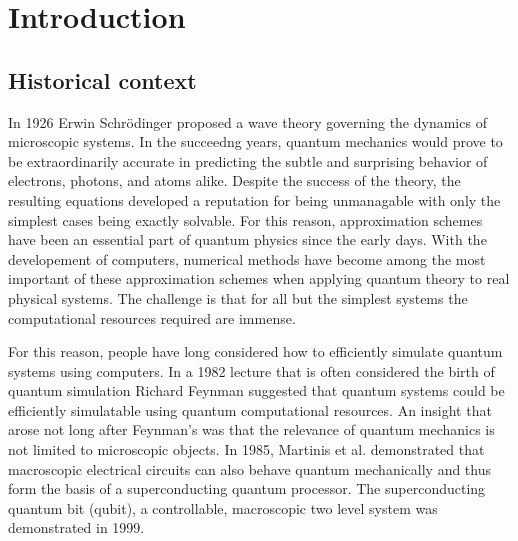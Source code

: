 \chapter{Introduction}\label{ch:introduction}
\section{Historical context}

In 1926 Erwin Schr\"odinger proposed a wave theory governing the dynamics of microscopic systems.\cite{Schrodinger1926}
In the succeedng years, quantum mechanics would prove to be extraordinarily accurate in predicting the subtle and surprising behavior of electrons, photons, and atoms alike.
Despite the success of the theory,
the resulting equations developed a reputation for being unmanagable with only the simplest cases being exactly solvable.
For this reason, approximation schemes have been an essential part of quantum physics since the early days.  %
With the developement of computers,
numerical methods have become among the most important of these approximation schemes when applying quantum theory to real physical systems.
The challenge is that for all but the simplest systems the computational resources required are immense.

For this reason, people have long considered how to efficiently simulate quantum systems using computers.
In a 1982 lecture that is often considered the birth of quantum simulation
Richard Feynman suggested that quantum systems could be efficiently simulatable using quantum computational resources.\cite{Feynman1982}
An insight that arose not long after Feynman's was that the relevance of quantum mechanics is not limited to microscopic objects.
In 1985, Martinis et al. demonstrated that macroscopic electrical circuits can also behave quantum mechanically and thus form the basis of a superconducting quantum processor.\cite{Martinis1985}
The superconducting quantum bit (qubit), a controllable, macroscopic two level system was demonstrated in 1999. \cite{Nakamura1999}

